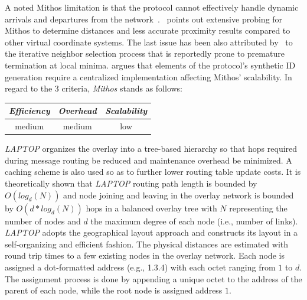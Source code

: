 A noted Mithos limitation is that the protocol cannot effectively
handle dynamic arrivals and departures from the network~\cite{RGJZ2004}. 
\cite{CCRK2004}~points out extensive probing for Mithos to determine 
distances and less accurate proximity results compared to other
virtual coordinate systems. The last issue  has been also attributed
by~\cite{WSS2005} to the iterative neighbor selection process that is 
reportedly prone to premature termination at local minima.
\cite{cox_vivaldi_2004} argues that elements of the protocol's
synthetic ID generation require a centralized implementation 
affecting Mithos' scalability.
In regard to the $3$ criteria, \emph{Mithos} stands as follows:
\begin{center}
{\footnotesize
\begin{tabular}{ccc}
\emph{Efficiency} & \emph{Overhead} & \emph{Scalability} \\
\hline
medium &
medium &
low
\end{tabular}
}
\end{center}

%
\emph{LAPTOP} \cite{WLH2007} organizes the overlay 
into a tree-based hierarchy so that 
hops required during message routing be reduced and 
maintenance overhead be minimized.
A caching scheme is also used so as
to further lower routing table update costs. 
It is theoretically shown that 
\emph{LAPTOP} routing path length is bounded by $O(log_d(N))$ and node
joining and leaving in the overlay network is bounded by
$O(d*log_d(N))$ hops in a balanced overlay tree with $N$ representing the
number of nodes and $d$ the maximum degree of each node (i.e., number of links). 
\emph{LAPTOP} adopts the geographical layout approach  
and constructs its layout in a self-organizing and 
efficient fashion. 
The physical distances are estimated
with round trip times to a few existing nodes in the overlay network.
Each node is assigned a dot-formatted address (e.g., 1.3.4) with
each octet ranging from $1$ to $d$.
The assignment process is done by appending a unique octet 
to the address of the parent of each node, while
the root node is assigned address $1$.

